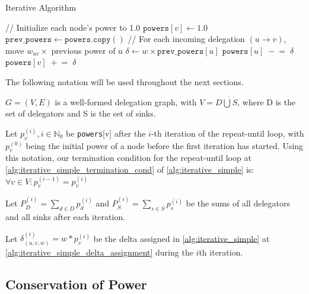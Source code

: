 \begin{algorithm} [H]
 \caption{Iterative Algorithm}\label{alg:iterative_simple}
\begin{algorithmic}[1]
\State // Initialize each node’s power to 1.0  
    \State \(\texttt{powers}[v] \gets 1.0\)
\EndFor
\Repeat
    \State \(\texttt{prev\_powers} \gets \texttt{powers}.\texttt{copy}()\)  
        \State // For each incoming delegation \((u \to v)\), move \(w_{uv}\times\) previous power of u
            \State \(\delta \gets w \times \texttt{prev\_powers}[u]\) \label{alg:iterative_simple_delta_assignment}
            \State \(\texttt{powers}[u] \;-\!=\; \delta\) \label{alg:iterative_simple_remove_delta}
            \State \(\texttt{powers}[v] \;+\!=\; \delta\) \label{alg:iterative_simple_add_delta}
        \EndFor
    \EndFor
{} \label{alg:iterative_simple_termination_cond}
\end{algorithmic}
\end{algorithm}

The following notation will be used throughout the next sections.

$G = (V, E)$ is a well-formed delegation graph, with $V = D \dot\bigcup S$, where D is the set of delegators and S is the set of sinks.

Let $p_v^{(i)}, i \in \mathbb{N}_0$ be \texttt{powers}[v] after the $i$-th iteration of the repeat-until loop, with $p_v^{(0)}$ being the initial power of a node before the first iteration has started. Using this notation, our termination condition for the repeat-until loop at \cref{alg:iterative_simple_termination_cond} of \cref{alg:iterative_simple} is: $\forall v \in V: p_v^{(i-1)} = p_v^{(i)}$

Let $P_D^{(i)} = \sum_{d \in D} p_d^{(i)}$ and $P_S^{(i)} = \sum_{s \in S} p_s^{(i)}$ be the sums of all delegators and all sinks after each iteration.

Let $\delta_{(u, v, w)}^{(i)} = w * p_v^{(i)}$ be the delta assigned in \cref{alg:iterative_simple} at \cref{alg:iterative_simple_delta_assignment} during the $i$th iteration.


\subsection{Conservation of Power}

